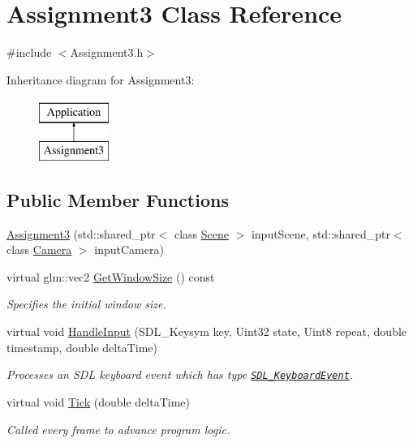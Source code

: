 \hypertarget{class_assignment3}{}\section{Assignment3 Class Reference}
\label{class_assignment3}


{\ttfamily \#include $<$Assignment3.\+h$>$}

Inheritance diagram for Assignment3\+:\begin{figure}[H]
\begin{center}
\leavevmode
\includegraphics[height=2.000000cm]{class_assignment3}
\end{center}
\end{figure}
\subsection*{Public Member Functions}
\begin{DoxyCompactItemize}
\item
\hyperlink{class_assignment3_adb8e9ac0681c600affc3370f5e5422b2}{Assignment3} (std\+::shared\+\_\+ptr$<$ class \hyperlink{class_scene}{Scene} $>$ input\+Scene, std\+::shared\+\_\+ptr$<$ class \hyperlink{class_camera}{Camera} $>$ input\+Camera)
\item
virtual glm\+::vec2 \hyperlink{class_assignment3_aec48ba5500d906963fdac555ee47cb72}{Get\+Window\+Size} () const
\begin{DoxyCompactList}\small\item\em Specifies the initial window size. \end{DoxyCompactList}\item
virtual void \hyperlink{class_assignment3_a1cc65ca321f39eb7092959b2dada8d31}{Handle\+Input} (S\+D\+L\+\_\+\+Keysym key, Uint32 state, Uint8 repeat, double timestamp, double delta\+Time)
\begin{DoxyCompactList}\small\item\em Processes an S\+DL keyboard event which has type \href{https://wiki.libsdl.org/SDL_KeyboardEvent}{\tt S\+D\+L\+\_\+\+Keyboard\+Event}. \end{DoxyCompactList}\item
virtual void \hyperlink{class_assignment3_a11256b6e7b38ab24baa92729cfb8ffe2}{Tick} (double delta\+Time)
\begin{DoxyCompactList}\small\item\em Called every frame to advance program logic. \end{DoxyCompactList}\end{DoxyCompactItemize}
